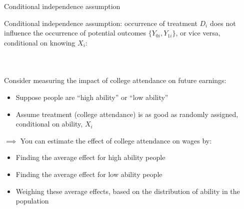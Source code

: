 \begin{frame}{Conditional independence assumption}

Conditional independence assumption: occurrence of treatment $D_i$ does not influence the occurrence of potential outcomes $\{Y_{0i}, Y_{1i}\}$, or vice versa, conditional on knowing $X_i$:

\begin{columns}
\begin{figure}
\end{figure}

\begin{figure}
\end{figure}

\end{columns}

Consider measuring the impact of college attendance on future earnings:
\begin{itemize}
    \item Suppose people are ``high ability'' or ``low ability''
    \item Assume treatment (college attendance) is as good as randomly assigned, conditional on ability, $X_i$
\end{itemize}
$\implies$ You can estimate the effect of college attendance on wages by:
\begin{itemize}
    \item Finding the average effect for high ability people
    \item Finding the average effect for low ability people
    \item Weighing these average effects, based on the distribution of ability in the population
\end{itemize}


\end{frame}

